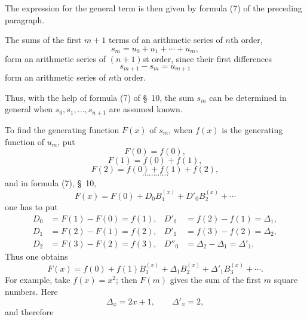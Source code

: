 

The expression for the general term is then given by formula (7) of the preceding paragraph.

The sums of the first $m+1$ terms of an arithmetic series of $n$th order,
\[
 s_m=u_0+u_1+\cdots+u_m,
\]
form an arithmetic series of $(n+1)$st order, since their first differences
\[
 s_{m+1}-s_m=u_{m+1}
\]
form an arithmetic series of $n$th order.

Thus, with the help of formula (7) of \S~10, the sum $s_m$ can be determined in general when $s_0,s_1,\ldots,s_{n+1}$ are assumed known.

To find the generating function $F(x)$ of $s_m$, when $f(x)$ is the generating function of $u_m$, put
\[
 F(0)=f(0),
\]
\[
 F(1)=f(0)+f(1),
\]
\[
 F(2)=f(0)+f(1)+f(2),
\]
\[
 \cdots\cdots\cdots\cdots
\]
and in formula (7), \S~10,
\[
 F(x)=F(0)+D_0B_1^{(x)}+D'_0B_2^{(x)}+\cdots
\]
one has to put
\[
\begin{aligned}
D_0&=F(1)-F(0)=f(1),& D'_0&=f(2)-f(1)=\Delta_1,\\
D_1&=F(2)-F(1)=f(2),& D'_1&=f(3)-f(2)=\Delta_2,\\
 D_2&=F(3)-F(2)=f(3),& D''_0&=\Delta_2-\Delta_1=\Delta'_1.
\end{aligned}
\]
Thus one obtains
\begin{equation}
 F(x)=f(0)+f(1)B_1^{(x)}+\Delta_1B_2^{(x)}+\Delta'_1B_3^{(x)}+\cdots.
\tag{4}
\end{equation}
For example, take $f(x)=x^2$; then $F(m)$ gives the sum of the first $m$ square numbers. Here
\[
 \Delta_x=2x+1,\qquad \Delta'_x=2,
\]
and therefore
